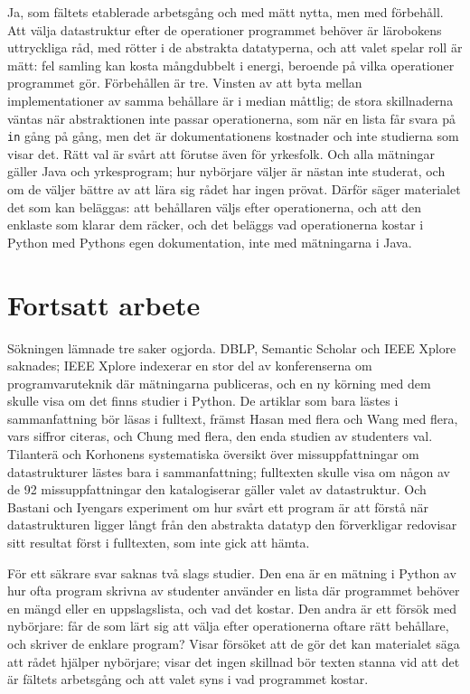 Ja, som fältets etablerade arbetsgång och med mätt nytta, men med
förbehåll.  Att välja datastruktur efter de operationer programmet
behöver är lärobokens uttryckliga råd\autocite{Shaffer2013DSA}, med
rötter i de abstrakta datatyperna\autocite{LiskovZilles1974}, och att
valet spelar roll är mätt: fel samling kan kosta mångdubbelt i energi,
beroende på vilka operationer programmet
gör\autocite{Hasan2016Energy}.  Förbehållen är tre.  Vinsten av att byta
mellan implementationer av samma behållare är i median
måttlig\autocite{Basios2018Darwinian,Wang2022Cres,Makor2025Profile};
de stora skillnaderna väntas när abstraktionen inte passar
operationerna, som när en lista får svara på \texttt{in}
gång på gång, men det är dokumentationens kostnader och inte
studierna som visar det.  Rätt val
är svårt att förutse även för yrkesfolk\autocite{Couderc2023Classification}.
Och alla mätningar gäller Java och yrkesprogram; hur nybörjare väljer
är nästan inte studerat, och om de väljer bättre av att lära sig rådet
har ingen prövat.  Därför
säger materialet det som kan beläggas: att behållaren väljs efter
operationerna, och att den enklaste som klarar dem räcker, och det
beläggs vad operationerna kostar i Python med Pythons egen
dokumentation, inte med mätningarna i Java.

\section{Fortsatt arbete}
\label{sec:vb-fortsatt}

Sökningen lämnade tre saker ogjorda.  DBLP, Semantic Scholar och IEEE
Xplore saknades; IEEE Xplore indexerar en stor del av konferenserna om
programvaruteknik där mätningarna publiceras, och en ny körning med
dem skulle visa om det finns studier i Python.  De artiklar som bara
lästes i sammanfattning bör läsas i fulltext, främst Hasan med flera och
Wang med flera, vars siffror citeras, och Chung med flera, den enda
studien av studenters val.  Tilanterä
och Korhonens systematiska översikt över missuppfattningar om
datastrukturer\autocite{Tilantera2026Misconceptions} lästes bara i
sammanfattning; fulltexten skulle visa om någon av de 92
missuppfattningar den katalogiserar gäller valet av datastruktur.  Och
Bastani och Iyengars experiment om hur svårt ett program är att förstå
när datastrukturen ligger långt från den abstrakta datatyp den
förverkligar\autocite{Bastani1987Logical} redovisar sitt resultat först
i fulltexten, som inte gick att hämta.

För ett säkrare svar saknas två slags studier.  Den ena är en mätning i
Python av hur ofta program skrivna av studenter använder en lista där
programmet behöver en mängd eller en uppslagslista, och vad det kostar.
Den andra är ett försök med nybörjare: får de som lärt sig att välja
efter operationerna oftare rätt behållare, och skriver de enklare
program?  Visar försöket att de gör det kan materialet säga att rådet
hjälper nybörjare; visar det ingen skillnad bör texten stanna vid att
det är fältets arbetsgång och att valet syns i vad programmet kostar.

